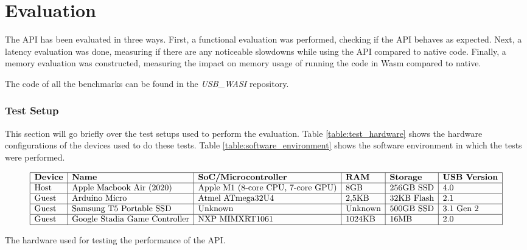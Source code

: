 \chapter{Evaluation}

The \acrshort{API} has been evaluated in three ways. First, a functional evaluation was performed, checking if the \acrshort{API} behaves as expected. Next, a latency evaluation was done, measuring if there are any noticeable slowdowns while using the \acrshort{API} compared to native code. Finally, a memory evaluation was constructed, measuring the impact on memory usage of running the code in \acrshort{Wasm} compared to native.

The code of all the benchmarks can be found in the \textit{USB\_WASI} \cite{usb_wasi_impl} repository.

\subsection{Test Setup}

This section will go briefly over the test setups used to perform the evaluation.
Table \ref{table:test_hardware} shows the hardware configurations of the devices used to do these tests. Table \ref{table:software_environment} shows the software environment in which the tests were performed.

\begin{table}[H]
\[
\begin{array}{|l|l|l|l|l|l|}
\hline
\textbf{Device} & \textbf{Name} & \textbf{SoC/Microcontroller} & \textbf{RAM} & \textbf{Storage} & \textbf{USB Version} \\
\hline
\text{Host} & \text{Apple Macbook Air (2020)} & \text{Apple M1 (8-core CPU, 7-core GPU)} & \text{8GB} & \text{256GB SSD} & \text{4.0} \\

\hline
\text{Guest} & \text{Arduino Micro} & \text{Atmel ATmega32U4} & \text{2,5KB} & \text{32KB Flash} & \text{2.1} \\

\hline
\text{Guest} & \text{Samsung T5 Portable SSD} & \text{Unknown} & \text{Unknown} & \text{500GB SSD} & \text{3.1 Gen 2} \\
\hline
\text{Guest} & \text{Google Stadia Game Controller} & \text{NXP MIMXRT1061} & \text{1024KB} & \text{16MB} & \text{2.0} \\
\hline
\end{array}
\]
\caption{The hardware used for testing the performance of the API.}
\label{table:test_hardware}
\end{table}

